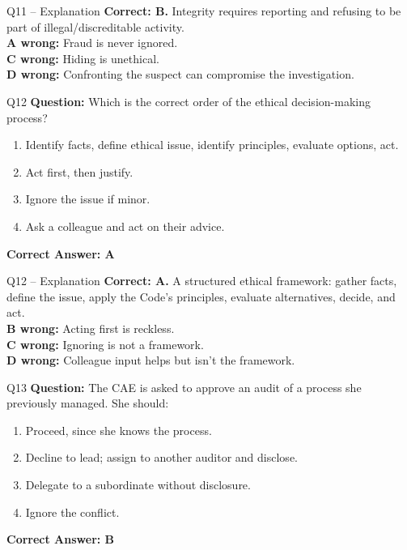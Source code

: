 \documentclass[aspectratio=169,10pt]{beamer}
\begin{document}
	\begin{frame}[t]{Q11 -- Explanation}
		\small
		\textbf{Correct: B.} Integrity requires reporting and refusing to be part of illegal/discreditable activity. \\[4pt]
		\textbf{A wrong:} Fraud is never ignored. \\[2pt]
		\textbf{C wrong:} Hiding is unethical. \\[2pt]
		\textbf{D wrong:} Confronting the suspect can compromise the investigation.
	\end{frame}
	
	\begin{frame}[t]{Q12}
		\small
		\textbf{Question:} Which is the correct order of the ethical decision-making process?
		\begin{enumerate}[label=\Alph*.,itemsep=1pt,topsep=2pt]
			\item Identify facts, define ethical issue, identify principles, evaluate options, act.
			\item Act first, then justify.
			\item Ignore the issue if minor.
			\item Ask a colleague and act on their advice.
		\end{enumerate}
		\vspace{4pt}
		\textbf{Correct Answer: A}
	\end{frame}
	
	\begin{frame}[t]{Q12 -- Explanation}
		\small
		\textbf{Correct: A.} A structured ethical framework: gather facts, define the issue, apply the Code's principles, evaluate alternatives, decide, and act. \\[4pt]
		\textbf{B wrong:} Acting first is reckless. \\[2pt]
		\textbf{C wrong:} Ignoring is not a framework. \\[2pt]
		\textbf{D wrong:} Colleague input helps but isn't the framework.
	\end{frame}
	
	\begin{frame}[t]{Q13}
		\small
		\textbf{Question:} The CAE is asked to approve an audit of a process she previously managed. She should:
		\begin{enumerate}[label=\Alph*.,itemsep=1pt,topsep=2pt]
			\item Proceed, since she knows the process.
			\item Decline to lead; assign to another auditor and disclose.
			\item Delegate to a subordinate without disclosure.
			\item Ignore the conflict.
		\end{enumerate}
		\vspace{4pt}
		\textbf{Correct Answer: B}
	\end{frame}
	
\end{document}
